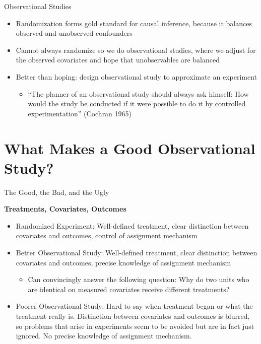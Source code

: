 \documentclass{beamer}
\numberwithin{equation}{section}
\begin{document}
\begin{frame}{Observational Studies}

\begin{itemize}
\itemsep1pt\parskip0pt
\item
  Randomization forms gold standard for causal inference, because it
  balances \alert{observed} and \alert{unobserved} confounders\medskip
\item
  Cannot always randomize so we do observational studies, where we
  \alert{adjust} for the \alert{observed covariates} and \alert{hope}
  that unobservables are balanced\medskip
\item
  Better than hoping: \alert{design} observational study to approximate
  an experiment

  \begin{itemize}
  \itemsep1pt\parskip0pt
  \item
    ``The planner of an observational study should always ask himself:
    How would the study be conducted if it were possible to do it by
    controlled experimentation'' (Cochran 1965)
  \end{itemize}
\end{itemize}

\end{frame}

\section{What Makes a Good Observational
Study?}\label{what-makes-a-good-observational-study}

\begin{frame}{The Good, the Bad, and the Ugly}

\textbf{Treatments, Covariates, Outcomes}

\begin{itemize}
\itemsep1pt\parskip0pt
\item
  \alert{Randomized Experiment}: Well-defined treatment, clear
  distinction between covariates and outcomes, control of assignment mechanism\medskip
\item
  \alert{Better Observational Study}: Well-defined treatment, clear
  distinction between covariates and outcomes, precise knowledge of assignment mechanism\

  \begin{itemize}
  \itemsep1pt\parskip0pt
  \item
    Can convincingly answer the following question: Why do two units who
    are identical on measured covariates receive different treatments?
  \end{itemize}
\item
  \alert{Poorer Observational Study}: Hard to say when treatment began
  or what the treatment really is. Distinction between covariates and
  outcomes is blurred, so problems that arise in experiments seem to be
  avoided but are in fact just ignored. No precise knowledge of assignment mechanism.
\end{itemize}

\end{frame}
\end{document}
